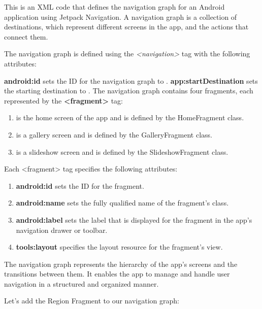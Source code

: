 \documentclass[a4paper, 12pt]{article}
\begin{document}
This is an XML code that defines the navigation graph for an Android application using Jetpack Navigation.
A navigation graph is a collection of destinations, which represent different screens in the app, and the actions that connect them.

The navigation graph is defined using the \textit{<navigation>} tag with the following attributes:

\textbf{android:id} sets the ID for the navigation graph to \texttt{}.
\textbf{app:startDestination} sets the starting destination to \texttt{}.
The navigation graph contains four fragments, each represented by the \textbf{<fragment>} tag:

\begin{enumerate}
    \item \textbf{\texttt{}} is the home screen of the app and is defined by the HomeFragment class.
    \item \textbf{\texttt{}} is a gallery screen and is defined by the GalleryFragment class.
    \item \textbf{\texttt{}} is a slideshow screen and is defined by the SlideshowFragment class.
\end{enumerate}

Each <fragment> tag specifies the following attributes:

\begin{enumerate}
    \item \textbf{android:id} sets the ID for the fragment.
    \item \textbf{android:name} sets the fully qualified name of the fragment's class.
    \item \textbf{android:label} sets the label that is displayed for the fragment in the app's navigation drawer or toolbar.
    \item \textbf{tools:layout} specifies the layout resource for the fragment's view.
\end{enumerate}

The navigation graph represents the hierarchy of the app's screens and the transitions between them. It enables the app to manage and handle user navigation in a structured and organized manner.

Let's add the Region Fragment to our navigation graph:
\end{document}
